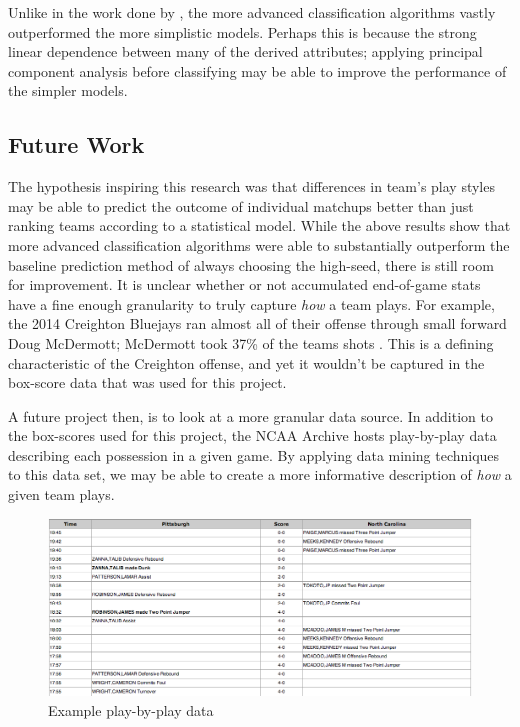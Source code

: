 \documentclass[]{article}
\begin{document}
Unlike in the work done by \cite{ncaaml}, the more advanced classification algorithms vastly outperformed the more simplistic models. Perhaps this is because the strong linear dependence between many of the derived attributes; applying principal component analysis before classifying may be able to improve the performance of the simpler models.

\subsection{Future Work}

The hypothesis inspiring this research was that differences in team's play styles may be able to predict the outcome of individual matchups better than just ranking teams according to a statistical model. While the above results show that more advanced classification algorithms were able to substantially outperform the baseline prediction method of always choosing the high-seed, there is still room for improvement. It is unclear whether or not accumulated end-of-game stats have a fine enough granularity to truly capture \textit{how} a team plays. For example, the 2014 Creighton Bluejays ran almost all of their offense through small forward Doug McDermott; McDermott took 37\% of the teams shots \cite{kenpom}. This is a defining characteristic of the Creighton offense, and yet it wouldn't be captured in the box-score data that was used for this project.

A future project then, is to look at a more granular data source. In addition to the box-scores used for this project, the NCAA Archive hosts play-by-play data describing each possession in a given game. By applying data mining techniques to this data set, we may be able to create a more informative description of \textit{how} a given team plays.

\begin{figure}[ht]
	\includegraphics[width=\linewidth]{play_by_play.png}
	\caption{Example play-by-play data}
	\label{fig:ex_play_by_play}
\end{figure}
\end{document}
